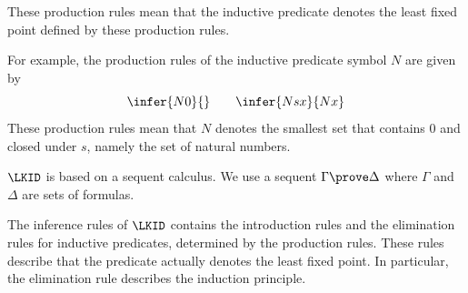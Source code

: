 These production rules mean that 
the inductive predicate denotes 
the least fixed point defined by these production rules.

For example, 
the production rules of the inductive predicate symbol $N$ are given by
\[
\infer{N0}{}
\qquad
\infer{Ns x}{Nx}
\]
These production rules mean that 
$N$ denotes the smallest set that contains 0 and closed under $s$,
namely the set of natural numbers.

$\LKID$ is based on a sequent calculus.
We use a sequent $\Gamma \prove \Delta$ where $\Gamma$ and $\Delta$
are sets of formulas.

The inference rules of $\LKID$ contains
the introduction rules and the elimination rules for inductive predicates,
determined by the production rules.
These rules describe that the predicate actually denotes the least fixed point.
In particular, the elimination rule describes the induction principle.

